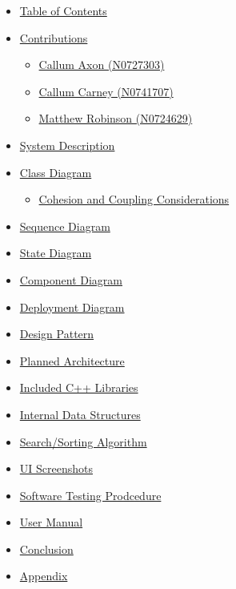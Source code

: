 \documentclass[
  english,
  a4paper,
,tablecaptionabove
]{scrartcl}
\providecommand{\tightlist}{%
  \setlength{\itemsep}{0pt}\setlength{\parskip}{0pt}}
\begin{document}
\begin{itemize}
\tightlist
\item
  \protect\hyperlink{table-of-contents}{Table of Contents}
\item
  \protect\hyperlink{contributions}{Contributions}

  \begin{itemize}
  \tightlist
  \item
    \protect\hyperlink{callum-axon-n0727303}{Callum Axon (N0727303)}
  \item
    \protect\hyperlink{callum-carney-n0741707}{Callum Carney (N0741707)}
  \item
    \protect\hyperlink{matthew-robinson-n0724629}{Matthew Robinson
    (N0724629)}
  \end{itemize}
\item
  \protect\hyperlink{system-description}{System Description}
\item
  \protect\hyperlink{class-diagram}{Class Diagram}

  \begin{itemize}
  \tightlist
  \item
    \protect\hyperlink{cohesion-and-coupling-considerations}{Cohesion
    and Coupling Considerations}
  \end{itemize}
\item
  \protect\hyperlink{sequence-diagram}{Sequence Diagram}
\item
  \protect\hyperlink{state-diagram}{State Diagram}
\item
  \protect\hyperlink{component-diagram}{Component Diagram}
\item
  \protect\hyperlink{deployment-diagram}{Deployment Diagram}
\item
  \protect\hyperlink{design-pattern}{Design Pattern}
\item
  \protect\hyperlink{planned-architecture}{Planned Architecture}
\item
  \protect\hyperlink{included-c-libraries}{Included C++ Libraries}
\item
  \protect\hyperlink{internal-data-structures}{Internal Data Structures}
\item
  \protect\hyperlink{searchsorting-algorithm}{Search/Sorting Algorithm}
\item
  \protect\hyperlink{ui-screenshots}{UI Screenshots}
\item
  \protect\hyperlink{software-testing-prodcedure}{Software Testing
  Prodcedure}
\item
  \protect\hyperlink{user-manual}{User Manual}
\item
  \protect\hyperlink{conclusion}{Conclusion}
\item
  \protect\hyperlink{appendix}{Appendix}
\end{itemize}
\end{document}
